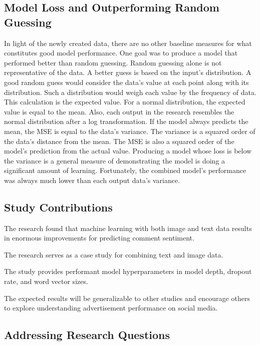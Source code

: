 \documentclass{article}
\begin{document}
\subsection{Model Loss and Outperforming Random Guessing}
In light of the newly created data, there are no other baseline measures for what constitutes good model performance. One goal was to produce a model that performed better than random guessing. Random guessing alone is not representative of the data. A better guess is based on the input's distribution. A good random guess would consider the data's value at each point along with its distribution. Such a distribution would weigh each value by the frequency of data. This calculation is the expected value. For a normal distribution, the expected value is equal to the mean. Also, each output in the research resembles the normal distribution after a log transformation. If the model always predicts the mean, the MSE is equal to the data's variance. The variance is a squared order of the data's distance from the mean. The MSE is also a squared order of the model's prediction from the actual value. Producing a model whose loss is below the variance is a general measure of demonstrating the model is doing a significant amount of learning. Fortunately, the combined model's performance was always much lower than each output data's variance.

\subsection{Study Contributions}

The research found that machine learning with both image and text data results in enormous improvements for predicting comment sentiment.

The research serves as a case study for combining text and image data.

The study provides performant model hyperparameters in model depth, dropout rate, and word vector sizes.

The expected results will be generalizable to other studies and encourage others to explore understanding advertisement performance on social media.

\subsection{Addressing Research Questions}
\end{document}
